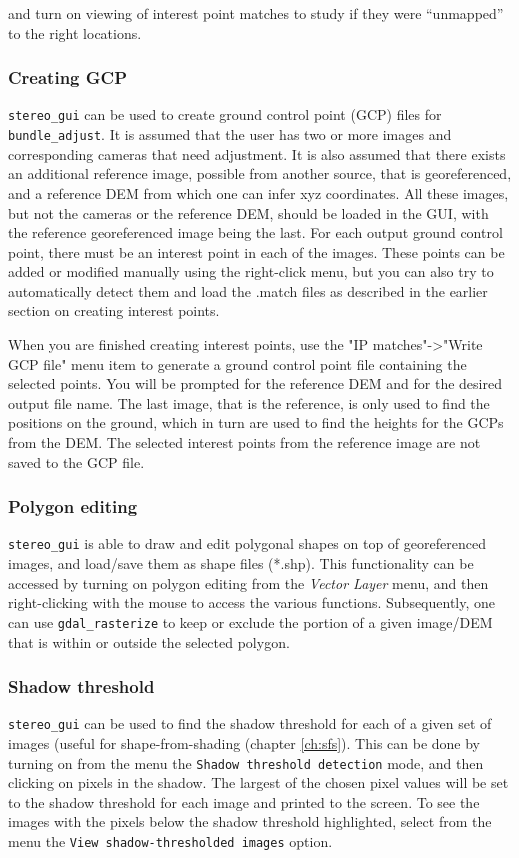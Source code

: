 and turn on viewing of interest point matches to study if they were
``unmapped'' to the right locations.

\subsubsection{Creating GCP}
\label{bagcp}

\texttt{stereo\_gui} can be used to create
ground control point (GCP) files for \texttt{bundle\_adjust}. It is
assumed that the user has two or more images and corresponding cameras
that need adjustment. It is also assumed that there exists an additional
reference image, possible from another source, that is georeferenced,
and a reference DEM from which one can infer xyz coordinates. All these
images, but not the cameras or the reference DEM, should be loaded in the
GUI, with the reference georeferenced image being the last. For each
output ground control point, there must be an interest point in each of 
the images. These points can be added or modified manually using 
the right-click menu, but you can also try to automatically detect them
and load the .match files as described in the earlier section on creating
interest points.

When you are finished creating interest points, use the "IP matches"->"Write GCP
file" menu item to generate a ground control point file containing the
selected points.  You will be prompted for the reference DEM and for the
desired output file name. The last image, that is the reference, is only
used to find the positions on the ground, which in turn are used to find
the heights for the GCPs from the DEM. The selected interest points from
the reference image are not saved to the GCP file.

\subsubsection{Polygon editing}

\texttt{stereo\_gui} is able to draw and edit polygonal shapes on top of georeferenced images, and load/save them as shape files (*.shp).
This functionality can be accessed by turning on polygon editing from the \textit{Vector Layer} menu, and then right-clicking with the mouse
to access the various functions. Subsequently, one can use \texttt{gdal\_rasterize} to keep or exclude the portion of a given image/DEM that is within
or outside the selected polygon. 


\subsubsection{Shadow threshold}
\texttt{stereo\_gui} can be used to find the shadow threshold for each
of a given set of images (useful for shape-from-shading (chapter \ref{ch:sfs}).
This can be done by turning on from the menu
the \texttt{Shadow threshold detection} mode, and then clicking on
pixels in the shadow. The largest of the chosen pixel values will be set
to the shadow threshold for each image and printed to the screen. To see
the images with the pixels below the shadow threshold highlighted,
select from the menu the \texttt{View shadow-thresholded images} option.

